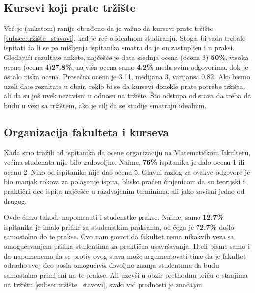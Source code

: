 \documentclass[a4paper]{article}
\begin{document}
{\subsection{Kursevi koji prate tržište}
\label{subsec:tržište_iskustva}

Već je (anketom) ranije obrađeno da je važno da kursevi prate tržište \ref{subsec:tržište_stavovi}, kad je reč o idealnom studiranju. Stoga, bi sada trebalo ispitati da li se po mišljenju ispitanika smatra da je on zastupljen i u praksi. Gledajući rezultate ankete, najčešće je data srednja ocena (ocena 3) \textbf{50\%}, visoka ocena (ocena 4)\textbf{27.8\%}, najviša ocena samo \textbf{4.2\%} među svim odgovorima, dok je ostalo niska ocena. Prosečna ocena je 3.11, medijana 3, varijansa 0.82. Ako bismo uzeli date rezultate u obzir, reklo bi se da kursevi donekle prate potrebe tržišta, ali da su još uvek nezavisni u odnosu na tržište. Što odstupa od stava da treba da budu u vezi sa tržištem, ako je cilj da se studije smatraju idealnim.

\subsection{Organizacija fakulteta i kurseva}
\label{subsec:organizacija_iskustva}

Kada smo tražili od ispitanika da ocene organizaciju na Matematičkom fakultetu, većina studenata nije bilo zadovoljno. Naime, \textbf{76\%} ispitanika je dalo ocenu 1 ili ocenu 2. Niko od ispitanika nije dao ocenu 5. Glavni razlog za ovakve odgovore je bio manjak rokova za polaganje ispita, blisko praćen činjenicom da su teorijski i praktični deo ispita najčešće u razdvojenim terminima, ali jako zavisni jedno od drugog.

Ovde ćemo takođe napomenuti i studenstke prakse. Naime, samo \textbf{12.7\%} ispitanika je imalo prilike za studenstkim praksama, od čega je \textbf{72.7\%} došlo samostalno do te prakse. Ovo nam govori da fakultet nema nikakvih veza sa omogućavanjem prilika studentima za praktična usavršavanja. Hteli bismo samo i da napomenemo da se protiv ovog stava može argumentovati time da je fakultet odradio svoj deo posla omogućivši dovoljno znanja studentima da budu samostalno primljeni na te prakse. Ali uzevši u obzir prethodnu priču o stanjima na tržištu \ref{subsec:tržište_stavovi}, svaki vid prednosti je značajan.

}
\end{document}
